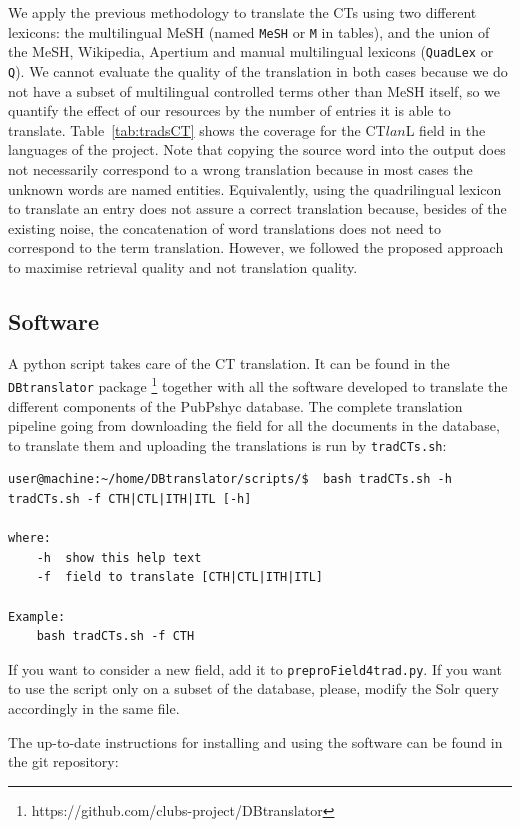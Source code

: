 \documentclass[a4paper,11pt]{article}
\begin{document}
\bigskip
We apply the previous methodology to translate the CTs using two different lexicons: the multilingual MeSH (named {\tt MeSH} or {\tt M} in tables), and the union of the MeSH, Wikipedia, Apertium and manual multilingual lexicons ({\tt QuadLex} or {\tt Q}). We cannot evaluate the quality of the translation in both cases because we do not have a subset of multilingual controlled terms other than MeSH itself, so we quantify the effect of our resources by the number of entries it is able to translate. Table~\ref{tab:tradsCT} shows the coverage for the CT$lan$L field in the languages of the project. Note that copying the source word into the output does not necessarily correspond to a wrong translation because in most cases the unknown words are named entities. Equivalently, using the quadrilingual lexicon to translate an entry does not assure a correct translation because, besides of the existing noise, the concatenation of word translations does not need to correspond to the term translation. However, we followed the proposed approach to maximise retrieval quality and not translation quality. 

\subsection{Software}

A python script takes care of the CT translation. It can be found in the {\tt DBtranslator} package%
\footnote{\url{}https://github.com/clubs-project/DBtranslator}
together with all the software developed to translate the different components of the PubPshyc database.
The complete translation pipeline going from downloading the field for all the documents in the database, to translate them and uploading the translations is run by {\tt tradCTs.sh}:

\begin{verbatim}
user@machine:~/home/DBtranslator/scripts/$  bash tradCTs.sh -h
tradCTs.sh -f CTH|CTL|ITH|ITL [-h] 

where:
    -h  show this help text
    -f  field to translate [CTH|CTL|ITH|ITL]

Example:
    bash tradCTs.sh -f CTH
\end{verbatim}

If you want to consider a new field, add it to {\tt preproField4trad.py}. If you want to use the script only on a subset of the database, please, modify the Solr query accordingly in the same file. 

The up-to-date instructions for installing and using the software can be found in the git repository:
\end{document}
